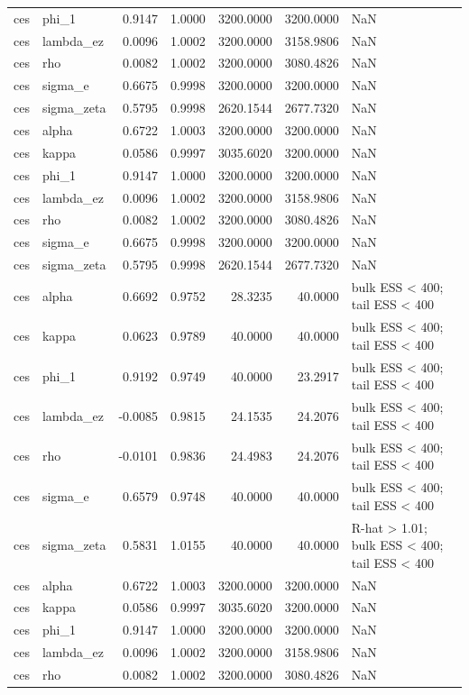 \begin{tabular}{llrrrrl}
ces & phi\_1 & 0.9147 & 1.0000 & 3200.0000 & 3200.0000 & NaN \\
ces & lambda\_ez & 0.0096 & 1.0002 & 3200.0000 & 3158.9806 & NaN \\
ces & rho & 0.0082 & 1.0002 & 3200.0000 & 3080.4826 & NaN \\
ces & sigma\_e & 0.6675 & 0.9998 & 3200.0000 & 3200.0000 & NaN \\
ces & sigma\_zeta & 0.5795 & 0.9998 & 2620.1544 & 2677.7320 & NaN \\
ces & alpha & 0.6722 & 1.0003 & 3200.0000 & 3200.0000 & NaN \\
ces & kappa & 0.0586 & 0.9997 & 3035.6020 & 3200.0000 & NaN \\
ces & phi\_1 & 0.9147 & 1.0000 & 3200.0000 & 3200.0000 & NaN \\
ces & lambda\_ez & 0.0096 & 1.0002 & 3200.0000 & 3158.9806 & NaN \\
ces & rho & 0.0082 & 1.0002 & 3200.0000 & 3080.4826 & NaN \\
ces & sigma\_e & 0.6675 & 0.9998 & 3200.0000 & 3200.0000 & NaN \\
ces & sigma\_zeta & 0.5795 & 0.9998 & 2620.1544 & 2677.7320 & NaN \\
ces & alpha & 0.6692 & 0.9752 & 28.3235 & 40.0000 & bulk ESS < 400; tail ESS < 400 \\
ces & kappa & 0.0623 & 0.9789 & 40.0000 & 40.0000 & bulk ESS < 400; tail ESS < 400 \\
ces & phi\_1 & 0.9192 & 0.9749 & 40.0000 & 23.2917 & bulk ESS < 400; tail ESS < 400 \\
ces & lambda\_ez & -0.0085 & 0.9815 & 24.1535 & 24.2076 & bulk ESS < 400; tail ESS < 400 \\
ces & rho & -0.0101 & 0.9836 & 24.4983 & 24.2076 & bulk ESS < 400; tail ESS < 400 \\
ces & sigma\_e & 0.6579 & 0.9748 & 40.0000 & 40.0000 & bulk ESS < 400; tail ESS < 400 \\
ces & sigma\_zeta & 0.5831 & 1.0155 & 40.0000 & 40.0000 & R-hat > 1.01; bulk ESS < 400; tail ESS < 400 \\
ces & alpha & 0.6722 & 1.0003 & 3200.0000 & 3200.0000 & NaN \\
ces & kappa & 0.0586 & 0.9997 & 3035.6020 & 3200.0000 & NaN \\
ces & phi\_1 & 0.9147 & 1.0000 & 3200.0000 & 3200.0000 & NaN \\
ces & lambda\_ez & 0.0096 & 1.0002 & 3200.0000 & 3158.9806 & NaN \\
ces & rho & 0.0082 & 1.0002 & 3200.0000 & 3080.4826 & NaN \\

\end{tabular}
